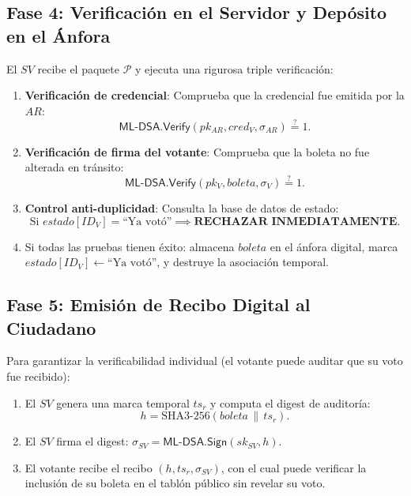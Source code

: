\documentclass[11pt,a4paper,twoside,openright]{book}
\theoremstyle{plain}
\theoremstyle{definition}
\theoremstyle{remark}
\newcommand{\MLDSA}{\textsf{ML-DSA}}
\newcommand{\Sign}{\mathsf{Sign}}
\newcommand{\Verify}{\mathsf{Verify}}
\begin{document}
\subsection{Fase 4: Verificaci\'on en el Servidor y Dep\'osito en el \'Anfora}
El $SV$ recibe el paquete $\mathcal{P}$ y ejecuta una rigurosa triple verificaci\'on:
\begin{enumerate}
  \item \textbf{Verificaci\'on de credencial}: Comprueba que la credencial fue emitida por la $AR$:
  \[
    \MLDSA.\Verify(pk_{AR}, \mathit{cred}_V, \sigma_{AR}) \stackrel{?}{=} 1.
  \]
  \item \textbf{Verificaci\'on de firma del votante}: Comprueba que la boleta no fue alterada en tr\'ansito:
  \[
    \MLDSA.\Verify(pk_V, \mathit{boleta}, \sigma_V) \stackrel{?}{=} 1.
  \]
  \item \textbf{Control anti-duplicidad}: Consulta la base de datos de estado:
  \[
    \text{Si } \mathit{estado}[ID_V] = \text{``Ya vot\'o''} \implies \textbf{RECHAZAR INMEDIATAMENTE}.
  \]
  \item Si todas las pruebas tienen \'exito: almacena $\mathit{boleta}$ en el \'anfora digital, marca $\mathit{estado}[ID_V] \leftarrow \text{``Ya vot\'o''}$, y destruye la asociaci\'on temporal.
\end{enumerate}

\subsection{Fase 5: Emisi\'on de Recibo Digital al Ciudadano}
Para garantizar la verificabilidad individual (el votante puede auditar que su voto fue recibido):
\begin{enumerate}
  \item El $SV$ genera una marca temporal $ts_r$ y computa el digest de auditor\'ia:
  \[
    h = \mathrm{SHA3}\text{-}256(\mathit{boleta} \,\|\, ts_r).
  \]
  \item El $SV$ firma el digest: $\sigma_{SV} = \MLDSA.\Sign(sk_{SV}, h)$.
  \item El votante recibe el recibo $(h, ts_r, \sigma_{SV})$, con el cual puede verificar la inclusi\'on de su boleta en el tabl\'on p\'ublico sin revelar su voto.
\end{enumerate}
\end{document}
